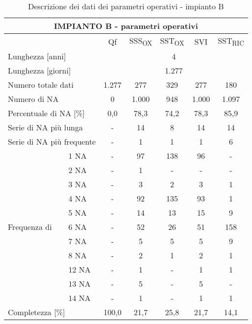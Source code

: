 \begin{sidewaystable}
\begin{center}	
\scriptsize
	\begin{tabular}{|ll|c|c|c|c|c|}
		\hline
		\multicolumn{7}{|c|}{\textbf{IMPIANTO B - parametri operativi}}                          \\ \hline
		\multicolumn{2}{|l|}{}                           & Qf   & SSS\textsubscript{OX} & SST\textsubscript{OX} & SVI   & SST\textsubscript{RIC} \\ \hline
		\multicolumn{2}{|l|}{Lunghezza {[}anni{]}}       & \multicolumn{5}{c|}{4}                \\ \hline
		\multicolumn{2}{|l|}{Lunghezza {[}giorni{]}}     & \multicolumn{5}{c|}{1.277}            \\ \hline
		\multicolumn{2}{|l|}{Numero totale dati}         & 1.277  & 277   & 329   & 277   & 180    \\ \hline
		\multicolumn{2}{|l|}{Numero di NA}               & 0  & 1.000 & 948   & 1.000 & 1.097  \\ \hline
		\multicolumn{2}{|l|}{Percentuale di NA {[}\%{]}} & 0,0 & 78,3  & 74,2  & 78,3  & 85,9   \\ \hline
		\multicolumn{2}{|l|}{Serie di NA più lunga}      & -    & 14    & 8     & 14    & 14     \\ \hline
		\multicolumn{2}{|l|}{Serie di NA più frequente}  & -    & 1     & 1     & 1     & 6      \\ \hline
		\multirow{11}{*}{Frequenza di}      & 1 NA       & -  & 97    & 138   & 96    & -      \\ \cline{3-7} 
		& 2 NA       & -   & 1     & -     & -     & -      \\ \cline{3-7} 
		& 3 NA       & -   & 3     & 2     & 3     & 1      \\ \cline{3-7} 
		& 4 NA       & -   & 92    & 135   & 93    & 1      \\ \cline{3-7} 
		& 5 NA       & -    & 14    & 13    & 15    & 9      \\ \cline{3-7} 
		& 6 NA       & -    & 52    & 26    & 51    & 158    \\ \cline{3-7} 
		& 7 NA       & -    & 5     & 5     & 5     & 9      \\ \cline{3-7} 
		& 8 NA       & -    & 2     & 1     & 2     & 1      \\ \cline{3-7} 
		& 12 NA      & -    & 1     & -     & 1     & 1      \\ \cline{3-7} 
		& 13 NA      & -    & 5     & -     & 5     & -      \\ \cline{3-7} 
		& 14 NA      & -    & 1     & -     & 1     & 1      \\ \hline
		\multicolumn{2}{|l|}{Completezza {[}\%{]}}       & 100,0 & 21,7  & 25,8  & 21,7  & 14,1   \\ \hline
	\end{tabular}
	\caption{Descrizione dei dati dei parametri operativi - impianto B}
	\label{tab:c_NApar-op}
\end{center}
\end{sidewaystable}

